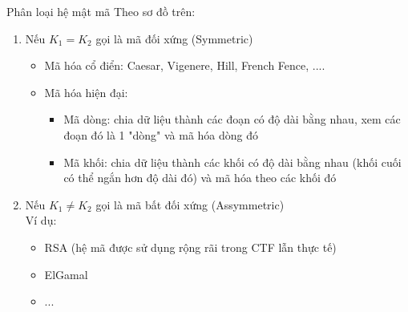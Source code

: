 \begin{frame}{Phân loại hệ mật mã}
Theo sơ đồ trên:
\begin{enumerate}
    \item Nếu $K_1 = K_2$ gọi là mã đối xứng (Symmetric)
    \begin{itemize}
        \item Mã hóa cổ điển: Caesar, Vigenere, Hill, French Fence, ....
        \item Mã hóa hiện đại:
        \begin{itemize}
        \item Mã dòng: chia dữ liệu thành các đoạn có độ dài bằng nhau, xem các đoạn đó là 1 "dòng" và mã hóa dòng đó
        \item Mã khối: chia dữ liệu thành các khối có độ dài bằng nhau (khối cuối có thể ngắn hơn độ dài đó) và mã hóa theo các khối đó
    \end{itemize}
    \end{itemize}
    \item Nếu $K_1 \neq K_2$ gọi là mã bất đối xứng (Assymmetric) \\ Ví dụ: 
    \begin{itemize}
        \item RSA (hệ mã được sử dụng rộng rãi trong CTF lẫn thực tế)
        \item ElGamal
        \item ...
    \end{itemize}
\end{enumerate}
\end{frame}